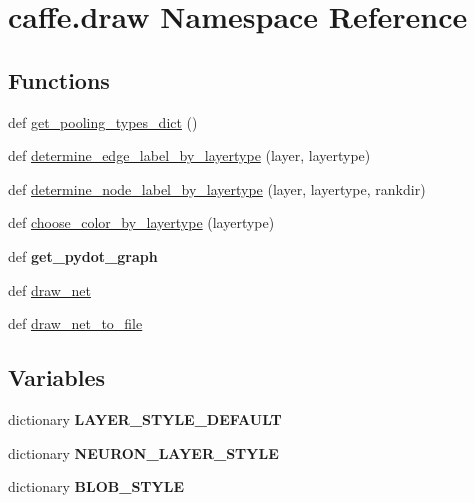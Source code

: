 \hypertarget{namespacecaffe_1_1draw}{}\section{caffe.\+draw Namespace Reference}
\label{namespacecaffe_1_1draw}
\subsection*{Functions}
\begin{DoxyCompactItemize}
\item 
def \hyperlink{namespacecaffe_1_1draw_a3e29c1cd2c9fb6c1cee315b84f9e90e7}{get\+\_\+pooling\+\_\+types\+\_\+dict} ()
\item 
def \hyperlink{namespacecaffe_1_1draw_a7e2ae7989557055211c44b1e9c187daa}{determine\+\_\+edge\+\_\+label\+\_\+by\+\_\+layertype} (layer, layertype)
\item 
def \hyperlink{namespacecaffe_1_1draw_abc4545db9dda6f8d6db7ae56a049de3c}{determine\+\_\+node\+\_\+label\+\_\+by\+\_\+layertype} (layer, layertype, rankdir)
\item 
def \hyperlink{namespacecaffe_1_1draw_a329b4be3aae2dd51158278ea32022512}{choose\+\_\+color\+\_\+by\+\_\+layertype} (layertype)
\item 
\hypertarget{namespacecaffe_1_1draw_a223ae748ac0fe5704e90c938e995572a}{}def {\bfseries get\+\_\+pydot\+\_\+graph}\label{namespacecaffe_1_1draw_a223ae748ac0fe5704e90c938e995572a}

\item 
def \hyperlink{namespacecaffe_1_1draw_af4843d9a765dafcb10193c6165671cb3}{draw\+\_\+net}
\item 
def \hyperlink{namespacecaffe_1_1draw_a28ab49b2cc53904012f304298400df40}{draw\+\_\+net\+\_\+to\+\_\+file}
\end{DoxyCompactItemize}
\subsection*{Variables}
\begin{DoxyCompactItemize}
\item 
dictionary {\bfseries L\+A\+Y\+E\+R\+\_\+\+S\+T\+Y\+L\+E\+\_\+\+D\+E\+F\+A\+U\+L\+T}
\item 
dictionary {\bfseries N\+E\+U\+R\+O\+N\+\_\+\+L\+A\+Y\+E\+R\+\_\+\+S\+T\+Y\+L\+E}
\item 
dictionary {\bfseries B\+L\+O\+B\+\_\+\+S\+T\+Y\+L\+E}
\end{DoxyCompactItemize}


